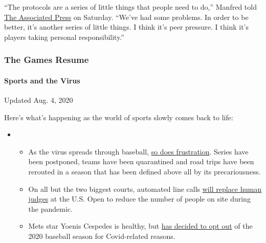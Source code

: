 ``The protocols are a series of little things that people need to do,''
Manfred told
\href{https://apnews.com/eff9d34788720e0b3d6df53c2779fd01}{The
Associated Press} on Saturday. ``We've had some problems. In order to be
better, it's another series of little things. I think it's peer
pressure. I think it's players taking personal responsibility.''

\hypertarget{the-games-resume}{%
\subsubsection{The Games Resume}\label{the-games-resume}}

\hypertarget{sports-and-the-virus}{%
\paragraph{Sports and the Virus}\label{sports-and-the-virus}}

Updated Aug. 4, 2020

Here's what's happening as the world of sports slowly comes back to
life:

\begin{itemize}
\item
  \begin{itemize}
  \tightlist
  \item
    As the virus spreads through baseball,
    \href{https://www.nytimes.com/2020/08/03/sports/baseball/mlb-coronavirus-outbreak.html?action=click\&pgtype=Article\&state=default\&region=MAIN_CONTENT_2\&context=storylines_keepup}{so
    does frustration}. Series have been postponed, teams have been
    quarantined and road trips have been rerouted in a season that has
    been defined above all by its precariousness.
  \item
    On all but the two biggest courts, automated line calls
    \href{https://www.nytimes.com/2020/08/03/sports/tennis/us-open-hawkeye-line-judges.html?action=click\&pgtype=Article\&state=default\&region=MAIN_CONTENT_2\&context=storylines_keepup}{will
    replace human judges} at the U.S. Open to reduce the number of
    people on site during the pandemic.
  \item
    Mets star Yoenis Cespedes is healthy, but
    \href{https://www.nytimes.com/2020/08/02/sports/baseball/Yoenis-cespedes-opt-out-rule.html?action=click\&pgtype=Article\&state=default\&region=MAIN_CONTENT_2\&context=storylines_keepup}{has
    decided to opt out} of the 2020 baseball season for Covid-related
    reasons.
  \end{itemize}
\end{itemize}

